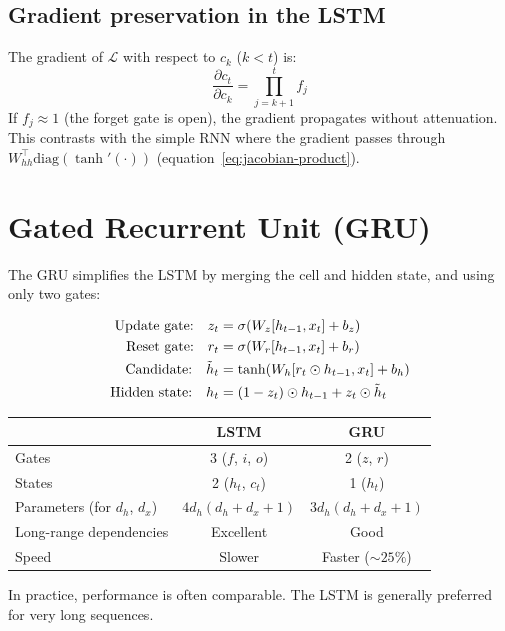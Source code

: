 \subsection{Gradient preservation in the LSTM}

\begin{proposition}
The gradient of $\mathcal{L}$ with respect to $c_k$ ($k < t$) is:
\begin{equation}
\frac{\partial c_t}{\partial c_k}
= \prod_{j=k+1}^{t} f_j
\label{eq:lstm-gradient}
\end{equation}
If $f_j \approx 1$ (the forget gate is open), the gradient propagates
without attenuation. This contrasts with the simple RNN where the gradient
passes through $W_{hh}^\top \text{diag}(\tanh'(\cdot))$
(equation~\ref{eq:jacobian-product}).
\end{proposition}

\section{Gated Recurrent Unit (GRU)}
\label{sec:gru}

The GRU \cite{cho2014learning} simplifies the LSTM by merging the cell and
hidden state, and using only two gates:

\begin{keyformulas}[title=\textbf{GRU equations}]
\begin{align}
\text{Update gate:} \quad
z_t &= \sigma(W_z [h_{t-1}, x_t] + b_z)
\label{eq:gru-update} \\
\text{Reset gate:} \quad
r_t &= \sigma(W_r [h_{t-1}, x_t] + b_r)
\label{eq:gru-reset} \\
\text{Candidate:} \quad
\tilde{h}_t &= \tanh(W_h [r_t \odot h_{t-1}, x_t] + b_h)
\label{eq:gru-candidate} \\
\text{Hidden state:} \quad
h_t &= (1 - z_t) \odot h_{t-1} + z_t \odot \tilde{h}_t
\label{eq:gru-hidden}
\end{align}
\end{keyformulas}

\begin{remark}
\begin{center}
\begin{tabular}{lcc}
\toprule
& \textbf{LSTM} & \textbf{GRU} \\
\midrule
Gates & 3 ($f$, $i$, $o$) & 2 ($z$, $r$) \\
States & 2 ($h_t$, $c_t$) & 1 ($h_t$) \\
Parameters (for $d_h$, $d_x$) & $4 d_h(d_h + d_x + 1)$ & $3 d_h(d_h + d_x + 1)$ \\
Long-range dependencies & Excellent & Good \\
Speed & Slower & Faster ($\sim 25\%$) \\
\bottomrule
\end{tabular}
\end{center}
In practice, performance is often comparable. The LSTM is generally
preferred for very long sequences.
\end{remark}

